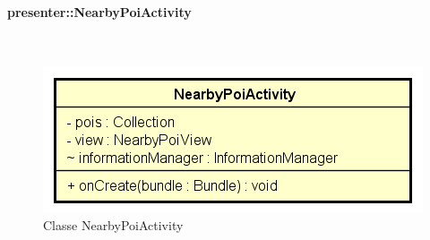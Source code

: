 \documentclass[../DefinizioneDiProdotto.tex]{subfiles}
\begin{document}
\paragraph{presenter::NearbyPoiActivity}
\
\begin{figure}[H]
	\centering
	\includegraphics[width=\maxwidth]{img/NearbyPoiActivity.png}
	\caption{Classe NearbyPoiActivity}\label{fig:presenter::NearbyPoiActivity} 
\end{figure}
\end{document}
